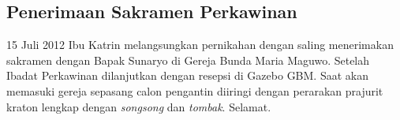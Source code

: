 
\subsection*{Penerimaan Sakramen Perkawinan}
15 Juli 2012 Ibu Katrin melangsungkan pernikahan dengan saling menerimakan sakramen dengan Bapak Sunaryo di Gereja Bunda Maria Maguwo. Setelah Ibadat Perkawinan dilanjutkan dengan resepsi di Gazebo GBM. Saat akan memasuki gereja sepasang calon pengantin diiringi dengan perarakan prajurit kraton lengkap dengan \textit{songsong} dan \textit{tombak}. Selamat. 
